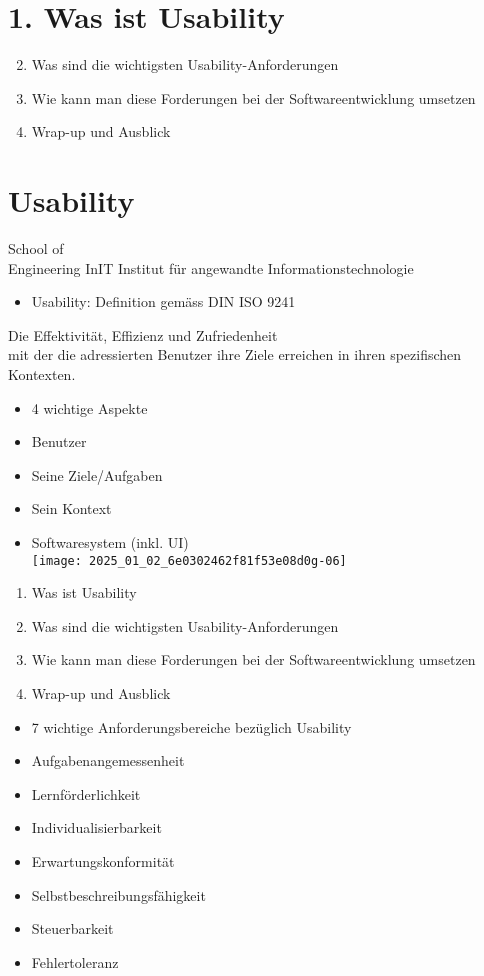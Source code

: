 \documentclass[10pt]{article}
\begin{document}
\section*{1. Was ist Usability}
\begin{enumerate}
  \setcounter{enumi}{1}
  \item Was sind die wichtigsten Usability-Anforderungen
  \item Wie kann man diese Forderungen bei der Softwareentwicklung umsetzen
  \item Wrap-up und Ausblick
\end{enumerate}

\section*{Usability}
School of\\
Engineering InIT Institut für angewandte Informationstechnologie

\begin{itemize}
  \item Usability: Definition gemäss DIN ISO 9241
\end{itemize}

Die Effektivität, Effizienz und Zufriedenheit\\
mit der die adressierten Benutzer ihre Ziele erreichen in ihren spezifischen Kontexten.

\begin{itemize}
  \item 4 wichtige Aspekte
  \item Benutzer
  \item Seine Ziele/Aufgaben
  \item Sein Kontext
  \item Softwaresystem (inkl. UI)\\
\texttt{[image: 2025\_01\_02\_6e0302462f81f53e08d0g-06]}
\end{itemize}

\begin{enumerate}
  \item Was ist Usability
  \item Was sind die wichtigsten Usability-Anforderungen
  \item Wie kann man diese Forderungen bei der Softwareentwicklung umsetzen
  \item Wrap-up und Ausblick
\end{enumerate}

\begin{itemize}
  \item 7 wichtige Anforderungsbereiche bezüglich Usability
  \item Aufgabenangemessenheit
  \item Lernförderlichkeit
  \item Individualisierbarkeit
  \item Erwartungskonformität
  \item Selbstbeschreibungsfähigkeit
  \item Steuerbarkeit
  \item Fehlertoleranz
\end{itemize}
\end{document}
